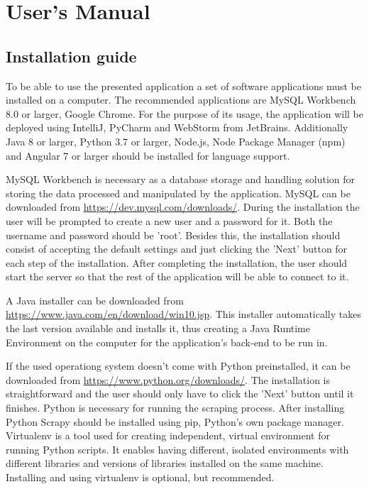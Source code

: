 \documentclass[12pt,a4paper,twoside]{report}
\begin{document}
\chapter{User's Manual}

\section{Installation guide}

To be able to use the presented application a set of software applications must be installed on a computer. The recommended applications are MySQL Workbench 8.0 or larger, Google Chrome. For the purpose of its usage, the application will be deployed using IntelliJ, PyCharm and WebStorm from JetBrains. Additionally Java 8 or larger, Python 3.7 or larger, Node.js, Node Package Manager (npm) and Angular 7 or larger should be installed for language support.

MySQL Workbench is necessary as a database storage and handling solution for storing the data processed and manipulated by the application. MySQL can be downloaded from \url{https://dev.mysql.com/downloads/}. During the installation the user will be prompted to create a new user and a password for it. Both the username and password should be 'root'. Besides this, the installation should consist of accepting the default settings and just clicking the 'Next' button for each step of the installation. After completing the installation, the user should start the server so that the rest of the application will be able to connect to it.

A Java installer can be downloaded from \url{https://www.java.com/en/download/win10.jsp}. This installer automatically takes the last version available and installs it, thus creating a Java Runtime Environment on the computer for the application's back-end to be run in.

If the used operationg system doesn't come with Python preinstalled, it can be downloaded from \url{https://www.python.org/downloads/}. The installation is straightforward and the user should only have to click the 'Next' button until it finishes. Python is necessary for running the scraping process. After installing Python Scrapy should be installed using pip, Python's own package manager. Virtualenv is a tool used for creating independent, virtual environment for running Python scripts. It enables having different, isolated environments with different libraries and versions of libraries installed on the same machine. Installing and using virtualenv is optional, but recommended.
\end{document}

